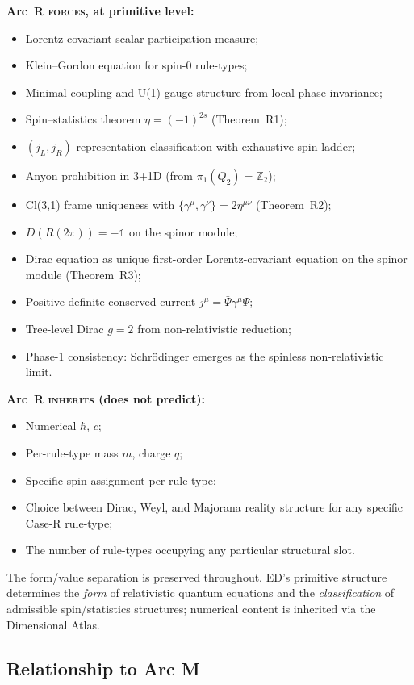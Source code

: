 \documentclass[11pt,a4paper]{article}
\begin{document}
\textbf{Arc~R \textsc{forces}, at primitive level:}
\begin{itemize}
  \item Lorentz-covariant scalar participation measure;
  \item Klein--Gordon equation for spin-0 rule-types;
  \item Minimal coupling and U(1) gauge structure from local-phase invariance;
  \item Spin--statistics theorem $\eta = (-1)^{2s}$ (Theorem~R1);
  \item $(j_L, j_R)$ representation classification with exhaustive spin ladder;
  \item Anyon prohibition in 3+1D (from $\pi_1(Q_2) = \mathbb{Z}_2$);
  \item Cl(3,1) frame uniqueness with $\{\gamma^\mu, \gamma^\nu\} = 2\eta^{\mu\nu}$ (Theorem~R2);
  \item $D(R(2\pi)) = -\mathbb{1}$ on the spinor module;
  \item Dirac equation as unique first-order Lorentz-covariant equation on the spinor module (Theorem~R3);
  \item Positive-definite conserved current $j^\mu = \bar\Psi \gamma^\mu \Psi$;
  \item Tree-level Dirac $g = 2$ from non-relativistic reduction;
  \item Phase-1 consistency: Schr\"odinger emerges as the spinless non-relativistic limit.
\end{itemize}

\textbf{Arc~R \textsc{inherits} (does not predict):}
\begin{itemize}
  \item Numerical $\hbar$, $c$;
  \item Per-rule-type mass $m$, charge $q$;
  \item Specific spin assignment per rule-type;
  \item Choice between Dirac, Weyl, and Majorana reality structure for any specific Case-R rule-type;
  \item The number of rule-types occupying any particular structural slot.
\end{itemize}
The form/value separation is preserved throughout. ED's primitive structure determines the \emph{form} of relativistic quantum equations and the \emph{classification} of admissible spin/statistics structures; numerical content is inherited via the Dimensional Atlas.

\subsection{Relationship to Arc M}
\end{document}
